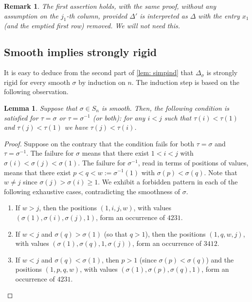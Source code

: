 \documentclass[12pt]{article}
\newtheorem{lemma}[theorem]{Lemma}
\newtheorem{remark}[theorem]{Remark}
\newcommand{\IM}{\Delta}
\begin{document}
\begin{remark}
The first assertion holds, with the same proof, without any assumption on the $j_1$-th column, provided $\IM'$ is
interpreted as $\IM$ with the entry $x_1$ (and the emptied first row) removed. We will not need this.
\end{remark}

\subsection{Smooth implies strongly rigid}

It is easy to deduce from the second part of \cref{lem: simpind} that $\IM_\sigma$ is strongly rigid for every smooth $\sigma$ by induction on $n$.
The induction step is based on the following observation.

\begin{lemma} \label{lem: red1row}
Suppose that $\sigma\in S_n$ is smooth. Then, the following condition is satisfied for $\tau=\sigma$ or $\tau=\sigma^{-1}$ (or both):
for any $i<j$ such that $\tau(i)<\tau(1)$ and $\tau(j)<\tau(1)$ we have $\tau(j)<\tau(i)$.
\end{lemma}

\begin{proof}
Suppose on the contrary that the condition fails for both $\tau=\sigma$ and $\tau=\sigma^{-1}$. The failure for
$\sigma$ means that there exist $1<i<j$ with $\sigma(i)<\sigma(j)<\sigma(1)$. The failure for $\sigma^{-1}$,
read in terms of positions of values, means that there exist $p<q<w:=\sigma^{-1}(1)$ with $\sigma(p)<\sigma(q)$.
Note that $w\ne j$ since $\sigma(j)>\sigma(i)\ge1$. We exhibit a forbidden pattern in each of the following
exhaustive cases, contradicting the smoothness of $\sigma$.
\begin{enumerate}
\item If $w>j$, then the positions $(1,i,j,w)$, with values $(\sigma(1),\sigma(i),\sigma(j),1)$, form an occurrence
of $4231$.
\item If $w<j$ and $\sigma(q)>\sigma(1)$ (so that $q>1$), then the positions $(1,q,w,j)$, with values
$(\sigma(1),\sigma(q),1,\sigma(j))$, form an occurrence of $3412$.
\item If $w<j$ and $\sigma(q)<\sigma(1)$, then $p>1$ (since $\sigma(p)<\sigma(q)$) and the positions $(1,p,q,w)$,
with values $(\sigma(1),\sigma(p),\sigma(q),1)$, form an occurrence of $4231$.\qedhere
\end{enumerate}
\end{proof}
\end{document}
